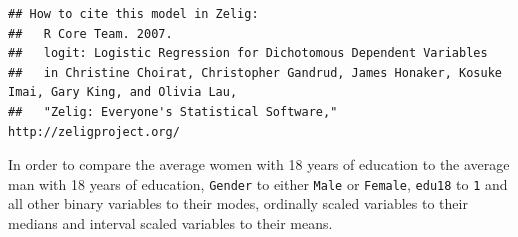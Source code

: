 \documentclass[]{article}
\newenvironment{Shaded}{\begin{snugshade}}{\end{snugshade}}
\newcommand{\KeywordTok}[1]{\textcolor[rgb]{0.13,0.29,0.53}{\textbf{{#1}}}}
\newcommand{\DataTypeTok}[1]{\textcolor[rgb]{0.13,0.29,0.53}{{#1}}}
\newcommand{\DecValTok}[1]{\textcolor[rgb]{0.00,0.00,0.81}{{#1}}}
\newcommand{\StringTok}[1]{\textcolor[rgb]{0.31,0.60,0.02}{{#1}}}
\newcommand{\NormalTok}[1]{{#1}}
\theoremstyle{definition}
\theoremstyle{definition}
\theoremstyle{remark}
\begin{document}
\begin{verbatim}
## How to cite this model in Zelig:
##   R Core Team. 2007.
##   logit: Logistic Regression for Dichotomous Dependent Variables
##   in Christine Choirat, Christopher Gandrud, James Honaker, Kosuke Imai, Gary King, and Olivia Lau,
##   "Zelig: Everyone's Statistical Software," http://zeligproject.org/
\end{verbatim}

In order to compare the average women with 18 years of education to the
average man with 18 years of education, \texttt{Gender} to either
\texttt{Male} or \texttt{Female}, \texttt{edu18} to \texttt{1} and all
other binary variables to their modes, ordinally scaled variables to
their medians and interval scaled variables to their means.

\begin{Shaded}
\end{Shaded}
\end{document}
